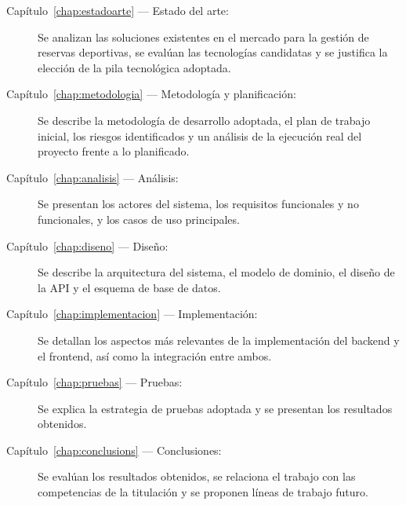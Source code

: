 \begin{description}
  \item[Capítulo~\ref{chap:estadoarte} — Estado del arte:] Se analizan las
    soluciones existentes en el mercado para la gestión de reservas deportivas,
    se evalúan las tecnologías candidatas y se justifica la elección de la pila
    tecnológica adoptada.

  \item[Capítulo~\ref{chap:metodologia} — Metodología y planificación:] Se
    describe la metodología de desarrollo adoptada, el plan de trabajo inicial,
    los riesgos identificados y un análisis de la ejecución real del proyecto
    frente a lo planificado.

  \item[Capítulo~\ref{chap:analisis} — Análisis:] Se presentan los actores del
    sistema, los requisitos funcionales y no funcionales, y los casos de uso
    principales.

  \item[Capítulo~\ref{chap:diseno} — Diseño:] Se describe la arquitectura del
    sistema, el modelo de dominio, el diseño de la API y el esquema de base
    de datos.

  \item[Capítulo~\ref{chap:implementacion} — Implementación:] Se detallan los
    aspectos más relevantes de la implementación del backend y el frontend,
    así como la integración entre ambos.

  \item[Capítulo~\ref{chap:pruebas} — Pruebas:] Se explica la estrategia de
    pruebas adoptada y se presentan los resultados obtenidos.

  \item[Capítulo~\ref{chap:conclusions} — Conclusiones:] Se evalúan los
    resultados obtenidos, se relaciona el trabajo con las competencias de la
    titulación y se proponen líneas de trabajo futuro.
\end{description}

